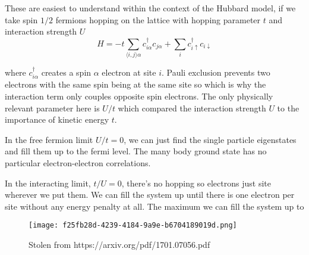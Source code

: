 These are easiest to understand within the context of the Hubbard model, if we take spin \(1/2\) fermions hopping on the lattice with hopping parameter \(t\) and interaction strength \(U\) \[ H = -t \sum_{\langle i,j \rangle \alpha} c^\dagger_{i\alpha} c_{j\alpha} + \sum_i c^\dagger_{i\uparrow} c_{i\downarrow}\]

where \(c^\dagger_{i\alpha}\) creates a spin \(\alpha\) electron at site \(i\). Pauli exclusion prevents two electrons with the same spin being at the same site so which is why the interaction term only couples opposite spin electrons. The only physically relevant parameter here is \(U/t\) which compared the interaction strength \(U\) to the importance of kinetic energy \(t\).

In the free fermion limit \(U/t = 0\), we can just find the single particle eigenstates and fill them up to the fermi level. The many body ground state has no particular electron-electron correlations.

In the interacting limit, \(t/U = 0\), there's no hopping so electrons just site wherever we put them. We can fill the system up until there is one electron per site without any energy penalty at all. The maximum we can fill the system up to

\begin{fignos:no-prefix-figure-caption}

\begin{figure}
\centering
\texttt{[image: f25fb28d-4239-4184-9a9e-b6704189019d.png]}
\caption{Stolen from https://arxiv.org/pdf/1701.07056.pdf}
\end{figure}

\end{fignos:no-prefix-figure-caption}

\begin{Shaded}
\begin{Highlighting}[]

\end{Highlighting}
\end{Shaded}
